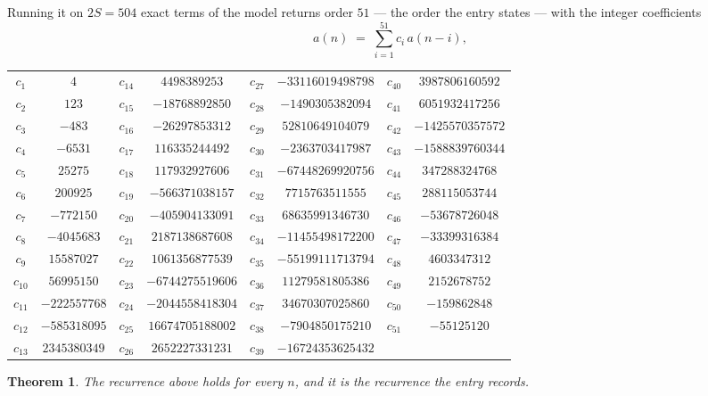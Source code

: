 \documentclass[11pt,a4paper]{article}
\theoremstyle{plain}
\newtheorem{theorem}{Theorem}
\theoremstyle{definition}
\begin{document}
Running it on $2S=504$ exact terms of the model returns order $51$ --- the order the
entry states --- with the integer coefficients
\[
a(n)\;=\;\sum_{i=1}^{51}c_i\,a(n-i),
\]
\begin{center}\small
\begin{tabular}{cccccccc}
$c_{1}$ & $4$ & $c_{14}$ & $4498389253$ & $c_{27}$ & $-33116019498798$ & $c_{40}$ & $3987806160592$ \\
$c_{2}$ & $123$ & $c_{15}$ & $-18768892850$ & $c_{28}$ & $-1490305382094$ & $c_{41}$ & $6051932417256$ \\
$c_{3}$ & $-483$ & $c_{16}$ & $-26297853312$ & $c_{29}$ & $52810649104079$ & $c_{42}$ & $-1425570357572$ \\
$c_{4}$ & $-6531$ & $c_{17}$ & $116335244492$ & $c_{30}$ & $-2363703417987$ & $c_{43}$ & $-1588839760344$ \\
$c_{5}$ & $25275$ & $c_{18}$ & $117932927606$ & $c_{31}$ & $-67448269920756$ & $c_{44}$ & $347288324768$ \\
$c_{6}$ & $200925$ & $c_{19}$ & $-566371038157$ & $c_{32}$ & $7715763511555$ & $c_{45}$ & $288115053744$ \\
$c_{7}$ & $-772150$ & $c_{20}$ & $-405904133091$ & $c_{33}$ & $68635991346730$ & $c_{46}$ & $-53678726048$ \\
$c_{8}$ & $-4045683$ & $c_{21}$ & $2187138687608$ & $c_{34}$ & $-11455498172200$ & $c_{47}$ & $-33399316384$ \\
$c_{9}$ & $15587027$ & $c_{22}$ & $1061356877539$ & $c_{35}$ & $-55199111713794$ & $c_{48}$ & $4603347312$ \\
$c_{10}$ & $56995150$ & $c_{23}$ & $-6744275519606$ & $c_{36}$ & $11279581805386$ & $c_{49}$ & $2152678752$ \\
$c_{11}$ & $-222557768$ & $c_{24}$ & $-2044558418304$ & $c_{37}$ & $34670307025860$ & $c_{50}$ & $-159862848$ \\
$c_{12}$ & $-585318095$ & $c_{25}$ & $16674705188002$ & $c_{38}$ & $-7904850175210$ & $c_{51}$ & $-55125120$ \\
$c_{13}$ & $2345380349$ & $c_{26}$ & $2652227331231$ & $c_{39}$ & $-16724353625432$ &  &  \\
\end{tabular}
\end{center}

\begin{theorem}
The recurrence above holds for every $n$, and it is the recurrence the entry records.
\end{theorem}
\end{document}

